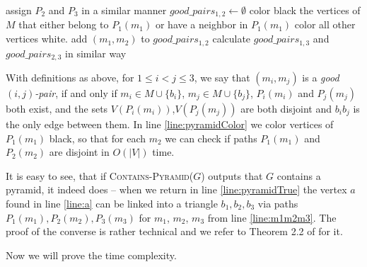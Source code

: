 \begin{algorithmic}[1]
				\ls assign $P_2$ and $P_3$ in a similar manner \label{line:ShortestPathsEnd}
				\ls $good\_pairs_{1,2} \gets \emptyset$ 
				 
						\ls color black the vertices of $M$ that either belong to \label{line:pyramidColor}
						\lsx $P_1(m_1)$ or have a neighbor in $P_1(m_1)$
						\ls color all other vertices white.
							 \label{line:pyramidColor2}
								\ls add $(m_1, m_2)$ to $good\_pairs_{1,2}$
							\mEndIf
						\mEndFor
					\mEndIf
				\mEndFor
				\ls calculate $good\_pairs_{1,3}$ and $good\_pairs_{2,3}$ in similar way
				 \label{line:m1m2m3}
						\ls \RETURN \TRUE \label{line:pyramidTrue}
					\mEndIf
				\mEndFor
			\mEndIf \label{line:pyramidEnd}
		\mEndFor
	\mEndFor
	\ls \RETURN \FALSE
	\mEndProcedure
\end{algorithmic}

With definitions as above, for $1 \leq i < j \leq 3$, we say that $(m_i, m_j)$ is a \emph{good $(i, j)$-pair}, if and only if $m_i \in M \cup \{b_i\}$, $m_j \in M \cup \{b_j\}$, $P_i(m_i)$ and $P_j(m_j)$ both exist, and the sets $V(P_i(m_i))$,$V(P_j(m_j))$ are both disjoint and $b_ib_j$ is the only edge between them. In line \ref{line:pyramidColor} we color vertices of $P_1(m_1)$ black, so that for each $m_2$ we can check if paths $P_1(m_1)$ and $P_2(m_2)$ are disjoint in $O(|V|)$ time.

It is easy to see, that if \textsc{Contains-Pyramid($G$)} outputs that $G$ contains a pyramid, it indeed does -- when we return in line \ref{line:pyramidTrue} the vertex $a$ found in line \ref{line:a} can be linked into a triangle $b_1, b_2, b_3$ via paths $P_1(m_1), P_2(m_2), P_3(m_3)$ for $m_1$, $m_2$, $m_3$ from line \ref{line:m1m2m3}. The proof of the converse is rather technical and we refer to Theorem 2.2 of \cite{MC05} for it.

Now we will prove the time complexity.

